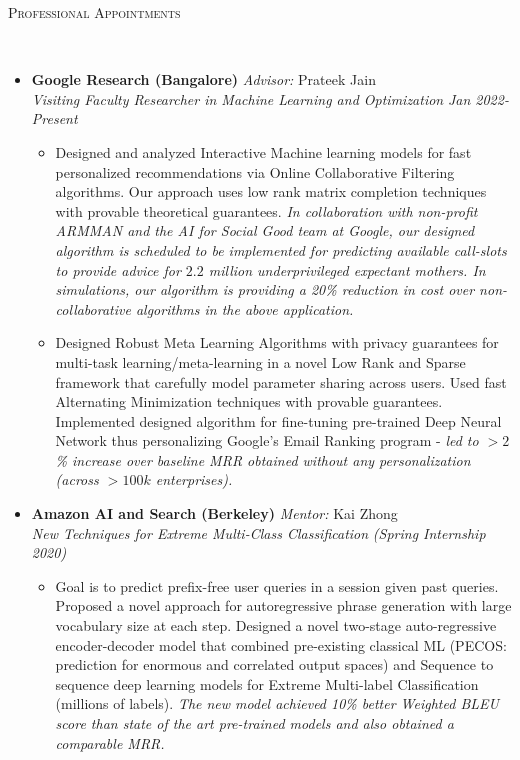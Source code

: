 \documentclass[9pt]{article}
\newenvironment{changemargin}[2]{%
  \begin{list}{}{%
    \setlength{\topsep}{0pt}%
    \setlength{\leftmargin}{0pt}%
    \setlength{\rightmargin}{#2}%
    \setlength{\listparindent}{\parindent}%
    \setlength{\itemindent}{\parindent}%
    \setlength{\parsep}{\parskip}%
  }%
  \item[]}{\end{list}
}
\newcommand{\lineover}{
	\begin{changemargin}{-0.05in}{-0.05in}
		\vspace*{-8pt}
		\hrulefill \\
		\vspace*{-2pt}
	\end{changemargin}
}
\newcommand{\header}[1]{
	\begin{changemargin}{-0.5in}{-0.5in}
		\scshape{#1}\\
  	\lineover
	\end{changemargin}
}
\newenvironment{body} {
	\vspace*{-16pt}
	\begin{changemargin}{-0.25in}{-0.5in}
  }	
	{\end{changemargin}
}
\begin{document}
\smallskip


\header{Professional Appointments}



\begin{body}
	\vspace{14pt}

\begin{itemize} \itemsep -0pt
       
\item \textbf{Google Research  (Bangalore)}\hfill{} \textit{Advisor:} Prateek Jain\\ \textit{Visiting Faculty Researcher in Machine Learning and Optimization} \hfill{} \emph{Jan 2022-Present}\\  
\begin{itemize}
      \item Designed and analyzed Interactive Machine learning models for fast personalized recommendations via Online Collaborative Filtering algorithms.
      Our approach uses low rank matrix completion techniques with provable theoretical guarantees. \textit{In collaboration with non-profit ARMMAN and the AI for Social Good team at Google, our designed algorithm is scheduled to be implemented for predicting available call-slots to provide advice for $2.2$ million underprivileged expectant mothers. In simulations, our algorithm is providing a 20\% reduction in cost over non-collaborative algorithms in the above application.}
      \item Designed Robust Meta Learning  Algorithms with privacy guarantees for multi-task learning/meta-learning in a novel Low Rank and Sparse framework that carefully model parameter sharing across users. Used fast Alternating Minimization techniques with provable guarantees. Implemented designed algorithm for fine-tuning pre-trained Deep Neural Network thus personalizing Google's Email Ranking program - \textit{led to $>2$\% increase over baseline MRR obtained without any personalization (across $>100k$ enterprises).}
\end{itemize}      
        
        \item \textbf{Amazon AI and Search  (Berkeley)}\hfill{} \textit{Mentor:} Kai Zhong\\ \textit{New Techniques for Extreme Multi-Class Classification} \hfill{} \emph{  (Spring Internship 2020)}\\
\begin{itemize}
\item Goal is to predict prefix-free user queries in a session given past queries. Proposed a novel approach for autoregressive phrase generation with large vocabulary size at each step. 
Designed a novel two-stage auto-regressive encoder-decoder model that combined pre-existing classical ML (PECOS: prediction for enormous and correlated output spaces) and Sequence to sequence deep learning models for Extreme Multi-label Classification (millions of labels). \textit{The new model achieved 10\% better Weighted BLEU score than state of the art pre-trained models and also obtained a comparable MRR.   }
\end{itemize}        
        

\end{itemize}
\end{body}
\end{document}
